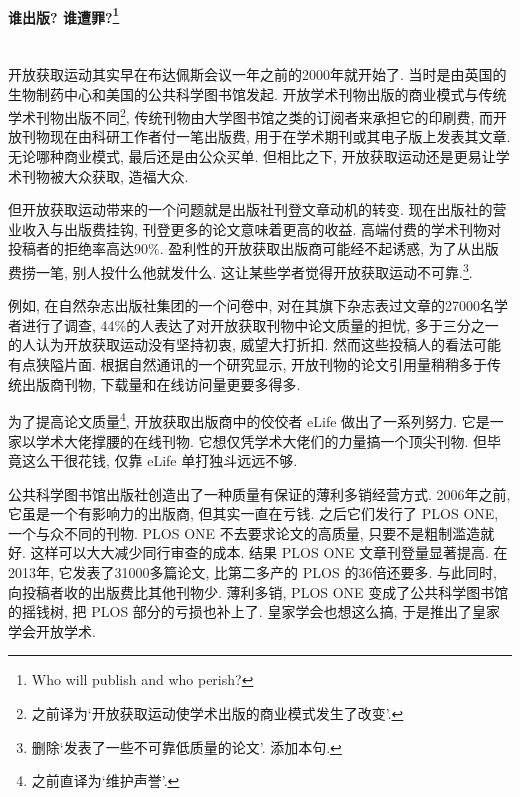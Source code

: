 \documentclass[a4paper, 12pt, UTF8]{article}
\begin{document}
\paragraph*{\large 谁出版? 谁遭罪?\footnote[4]{Who will publish and who perish?}} \hspace{10pt} \\

开放获取运动其实早在布达佩斯会议一年之前的2000年就开始了. 当时是由英国的生物制药中心和美国的公共科学图书馆发起. 开放学术刊物出版的商业模式与传统学术刊物出版不同\footnote[5]{之前译为\lq 开放获取运动使学术出版的商业模式发生了改变\rq.}, 传统刊物由大学图书馆之类的订阅者来承担它的印刷费, 而开放刊物现在由科研工作者付一笔出版费, 用于在学术期刊或其电子版上发表其文章. 无论哪种商业模式, 最后还是由公众买单. 但相比之下, 开放获取运动还是更易让学术刊物被大众获取, 造福大众.

但开放获取运动带来的一个问题就是出版社刊登文章动机的转变. 现在出版社的营业收入与出版费挂钩, 刊登更多的论文意味着更高的收益. 高端付费的学术刊物对投稿者的拒绝率高达90\%. 盈利性的开放获取出版商可能经不起诱惑, 为了从出版费捞一笔, 别人投什么他就发什么. 这让某些学者觉得开放获取运动不可靠.\footnote[6]{删除\lq 发表了一些不可靠低质量的论文\rq. 添加本句.}.

例如, 在自然杂志出版社集团的一个问卷中, 对在其旗下杂志表过文章的27000名学者进行了调查, 44\%的人表达了对开放获取刊物中论文质量的担忧, 多于三分之一的人认为开放获取运动没有坚持初衷, 威望大打折扣. 然而这些投稿人的看法可能有点狭隘片面. 根据自然通讯的一个研究显示, 开放刊物的论文引用量稍稍多于传统出版商刊物, 下载量和在线访问量更要多得多.

为了提高论文质量\footnote[7]{之前直译为\lq 维护声誉\rq.}, 开放获取出版商中的佼佼者 eLife 做出了一系列努力. 它是一家以学术大佬撑腰的在线刊物. 它想仅凭学术大佬们的力量搞一个顶尖刊物. 但毕竟这么干很花钱, 仅靠 eLife 单打独斗远远不够.

公共科学图书馆出版社创造出了一种质量有保证的薄利多销经营方式. 2006年之前, 它虽是一个有影响力的出版商, 但其实一直在亏钱. 之后它们发行了 PLOS ONE, 一个与众不同的刊物. PLOS ONE 不去要求论文的高质量, 只要不是粗制滥造就好. 这样可以大大减少同行审查的成本. 结果 PLOS ONE 文章刊登量显著提高. 在2013年, 它发表了31000多篇论文, 比第二多产的 PLOS 的36倍还要多. 与此同时, 向投稿者收的出版费比其他刊物少. 薄利多销, PLOS ONE 变成了公共科学图书馆的摇钱树, 把 PLOS 部分的亏损也补上了. 皇家学会也想这么搞, 于是推出了皇家学会开放学术.
\end{document}
